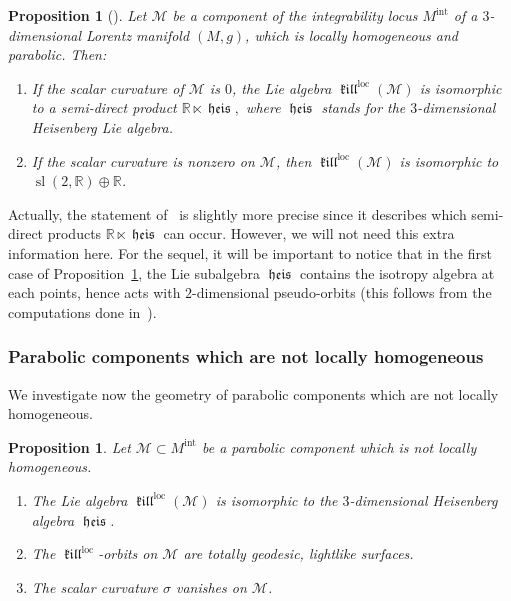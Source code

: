 \documentclass[11pt]{article}
\newtheorem{prop}[theo]{Proposition}
\theoremstyle{definition}
\numberwithin{equation}{section}
\numberwithin{figure}{section}
\numberwithin{table}{section}
\DeclareMathOperator{\loc}{loc}
\newcommand{\mint}{{M^{\intl}}}
\DeclareMathOperator{\intl}{int}
\DeclareMathOperator{\slop}{sl}
\newcommand{\sld}{\slop(2,\RR)}
\DeclareMathOperator{\kil}{{\mathfrak{kill}}}
\newcommand{\kiloc}{\kil^{\loc}}
\DeclareMathOperator{\heis}{{\mathfrak{heis}}}
\newcommand{\calm}{\mathcal{M}}
\newcommand*\RR{\mathbb{R}}
\begin{document}
\begin{prop}[{\cite[Proposition~4.3]{frances.open}}]\label{prop.lochomoparabolique}
Let $\calm$ be a component of the integrability locus $\mint$ of a $3$-dimensional Lorentz manifold $(M,g)$, which is locally homogeneous and parabolic. Then:
\begin{enumerate}
\item \label{6.2.1} If the scalar curvature of $\calm$ is $0$, the Lie algebra $\kiloc(\calm)$ is isomorphic to a semi-direct product $\RR \ltimes \heis,$ where $\heis$ stands for the $3$-dimensional Heisenberg Lie algebra.
\item \label{6.2.2} If the scalar curvature is nonzero on $\calm$, then $\kiloc(\calm)$ is isomorphic to $\sld \oplus \RR$.
\end{enumerate}
\end{prop}


Actually, the statement of~\cite{frances.open} is slightly more precise since it describes which semi-direct products $\RR \ltimes \heis$ can occur. However, we will not need this extra information here. For the sequel, it will be important to notice that in the first case of Proposition~\ref{prop.lochomoparabolique}, the Lie subalgebra $\heis$ contains the isotropy algebra at each points, hence acts with $2$-dimensional pseudo-orbits (this follows from the computations done in~\cite[Section~4.3.3]{frances.open}).

\subsubsection{Parabolic components which are not locally homogeneous}
We investigate now the geometry of parabolic components which are not locally homogeneous.

\begin{prop}\label{prop.heis}
Let $\calm \subset \mint$ be a parabolic component which is not locally homogeneous.
\begin{enumerate}
\item \label{6.3.1}The Lie algebra $\kiloc(\calm)$ is isomorphic to the $3$-dimensional Heisenberg algebra $\heis$. 
\item \label{6.3.2}The $\kiloc$-orbits on $\calm$ are totally geodesic, lightlike surfaces.
\item \label{6.3.3}The scalar curvature $\sigma$ vanishes on $\calm$.
\end{enumerate}
\end{prop}
\end{document}
